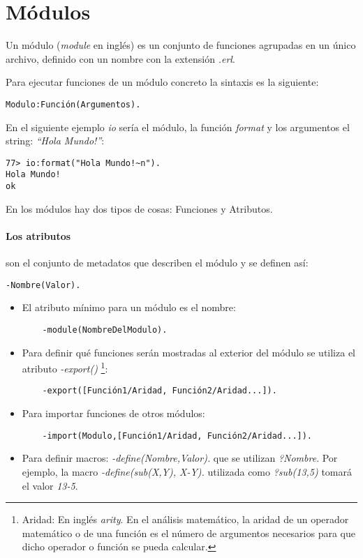 \section{Módulos}

Un módulo (\textit{module} en inglés) es un conjunto de funciones agrupadas en un único archivo, definido con
un nombre con la extensión \textit{.erl}.

Para ejecutar funciones de un módulo concreto la sintaxis es la siguiente:

\begin{verbatim}
Modulo:Función(Argumentos).
\end{verbatim}

En el siguiente ejemplo \textit{io} sería el módulo, la función \textit{format} y los argumentos el string:
\textit{``Hola Mundo!''}:
\begin{lstlisting}
77> io:format("Hola Mundo!~n").
Hola Mundo!
ok
\end{lstlisting}

En los módulos hay dos tipos de cosas: Funciones y Atributos.

\paragraph{Los atributos} son el conjunto de metadatos que describen el módulo y se definen así:
\begin{verbatim}
-Nombre(Valor).
\end{verbatim}

\begin{itemize}
  \item El atributo mínimo para un módulo es el nombre:
    \begin{verbatim}
    -module(NombreDelModulo).
    \end{verbatim}

  \item Para definir qué funciones serán mostradas al exterior del módulo se utiliza el atributo
    \textit{-export()} \footnote{Aridad: En inglés \textit{arity}. En el análisis
    matemático, la aridad de un operador matemático o de una función es el número de argumentos necesarios
    para que dicho operador o función se pueda calcular.}:
    \begin{verbatim}
    -export([Función1/Aridad, Función2/Aridad...]).
    \end{verbatim}

  \item Para importar funciones de otros módulos:
    \begin{verbatim}
    -import(Modulo,[Función1/Aridad, Función2/Aridad...]).
    \end{verbatim}

  \item Para definir macros: \textit{-define(Nombre,Valor).} que se utilizan \textit{?Nombre}. Por ejemplo,
  la macro \textit{-define(sub(X,Y), X-Y).} utilizada como \textit{?sub(13,5)} tomará el valor \textit{13-5}.
\end{itemize}


